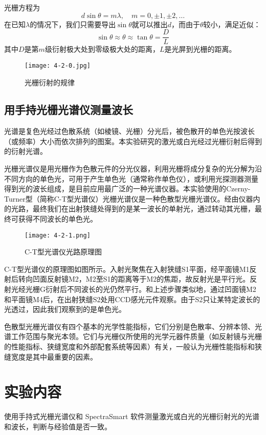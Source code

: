 \documentclass[12pt]{article}
\begin{document}
光栅方程为
\[
    d\sin\theta = m\lambda,\quad m = 0,\pm1,\pm2,\dots
\]
在已知$\lambda$的情况下，我们只需要导出$\sin\theta$就可以推出$d$，而由于$\theta$较小，满足近似：
\[
    \sin \theta \approx \theta \approx \tan \theta = \frac{D}{L}
\]
其中$D$是第$m$级衍射极大处到零级极大处的距离，$L$是光屏到光栅的距离。

\begin{figure}[h!]
    \centering
    \texttt{[image: 4-2-0.jpg]}
    \caption{光栅衍射的规律}
\end{figure}

\subsection{用手持光栅光谱仪测量波长}
光谱是复色光经过色散系统（如棱镜、光栅）分光后，被色散开的单色光按波长（或频率）大小而依次排列的图案。本实验研究的激光或白光经过光栅衍射后得到的衍射光谱。

光栅光谱仪是用光栅作为色散元件的分光仪器，利用光栅将成分复杂的光分解为沿不同方向的单色光，可用于产生单色光（通常称作单色仪），或利用光探测器测量得到光的波长组成，是目前应用最广泛的一种光谱仪器。本实验使用的Czerny-Turner型（简称C-T型光谱仪）光栅光谱仪是一种色散型光栅光谱仪。经由仪器内的光路，最终我们在出射狭缝处得到的是某一波长的单射光，通过转动其光栅，最终可获得不同波长的单色光。

\begin{figure}[h!]
    \centering
    \texttt{[image: 4-2-1.png]}
    \caption{C-T型光谱仪光路原理图}
\end{figure}

C-T型光谱仪的原理图如图所示。入射光聚焦在入射狭缝S1平面，经平面镜M1反射后转向凹面反射镜M2，M2至S1的距离等于M2的焦距，故反射光是平行光。反射光经光栅G衍射后不同波长的光仍然平行。和上述步骤类似地，通过凹面镜M2和平面镜M4后，在出射狭缝S2处用CCD感光元件观察。由于S2只让某特定波长的光透过，因此我们观察到的是单色光。

色散型光栅光谱仪有四个基本的光学性能指标，它们分别是色散率、分辨本领、光谱工作范围与聚光本领。它们与光栅仪所使用的光学元器件质量（如反射镜与光栅的性能指标、狭缝宽度和外部配套系统等因素）有关，一般认为光栅性能指标和狭缝宽度是其中最重要的因素。

\section{实验内容}
使用手持式光栅光谱仪和 SpectraSmart 软件测量激光或白光的光栅衍射光的光谱和波长，判断与经验值是否一致。
\end{document}
